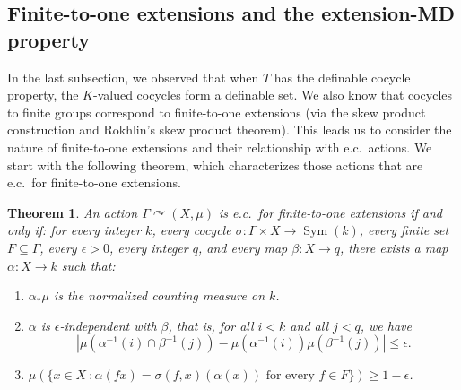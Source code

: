\documentclass[12pt]{amsart}
\newtheorem{thm}{Theorem}[section]
\theoremstyle{definition}
\newcommand{\acts}{\curvearrowright}
\begin{document}
\subsection{Finite-to-one extensions and the extension-MD property}\label{subs:weakMD}

In the last subsection, we observed that when $T$ has the definable cocycle property, the $K$-valued cocycles form a definable set. We also know that cocycles to finite groups correspond to finite-to-one extensions (via the skew product construction and Rokhlin's skew product theorem). This leads us to consider the nature of finite-to-one extensions and their relationship with e.c.\ actions. We start with the following theorem, which characterizes those actions that are e.c.\ for finite-to-one extensions.

\begin{thm}\label{concretetheorem}
An action $\Gamma\acts(X,\mu)$ is e.c.\ for finite-to-one extensions if and only if: for every integer $k$, every cocycle $\sigma : \Gamma \times X \rightarrow \operatorname{Sym}(k)$, every finite set $F\subseteq \Gamma$, every $\epsilon > 0$, every integer $q$, and every map $\beta : X \to q$, there exists a map $\alpha : X \to k$ such that:
\begin{enumerate}
    \item $\alpha_*\mu$ is the normalized counting measure on $k$.
    \item $\alpha$ is $\epsilon$-independent with $\beta$, that is, for all $i< k$ and all $j<q$, we have
    $$\left|\mu(\alpha^{-1}(i)\cap \beta^{-1}(j))-\mu(\alpha^{-1}(i))\mu(\beta^{-1}(j))\right|\leq \epsilon.$$
    \item $\mu(\{x\in X \ : \alpha(f x) = \sigma(f,x)(\alpha(x)) \text{ for every }f \in F\})\geq 1-\epsilon$.
\end{enumerate}
\end{thm}
\end{document}
